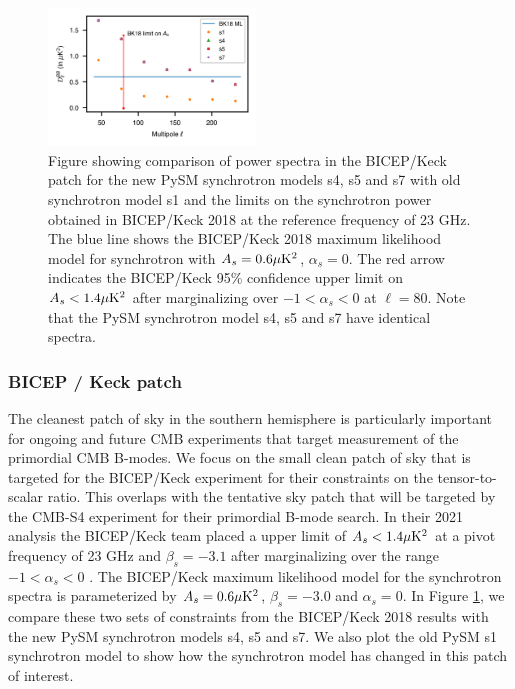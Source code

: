 \documentclass[twocolumn]{aastex631}
\begin{document}
\begin{figure}
    \centering
    \includegraphics[width=0.49\textwidth]{figures/Dlcomp_PySM3-4b8_BKpatch.png}
    \caption{Figure showing comparison of power spectra in the BICEP/Keck patch for the new PySM synchrotron models s4, s5 and s7 with old synchrotron model s1 and the limits on the synchrotron power obtained in BICEP/Keck 2018 \citep{Ade:2021} at the reference frequency of 23 GHz. The blue line shows the BICEP/Keck 2018 maximum likelihood model for synchrotron with $A_s=0.6 \mu {\rm K}^2$, $\alpha_s=0$. The red arrow indicates the BICEP/Keck 95\% confidence upper limit on $A_s<1.4 \mu {\rm K}^2$ after marginalizing over $-1<\alpha_s<0$ at $\ell=80$. Note that the PySM synchrotron model s4, s5 and s7 have identical spectra.}
    \label{fig:Dl_sync_BK}
\end{figure}

\subsubsection{BICEP / Keck patch}
The cleanest patch of sky in the southern hemisphere is particularly important for ongoing and future CMB experiments that target measurement of the primordial CMB B-modes. We focus on the small clean patch of sky that is targeted for the BICEP/Keck experiment for their constraints on the tensor-to-scalar ratio. This overlaps with the tentative sky patch that will be targeted by the CMB-S4 experiment for their primordial B-mode search. In their 2021 analysis the BICEP/Keck team placed a upper limit of $A_s<1.4 \mu{\rm K}^2$ at a pivot frequency of 23 GHz and $\beta_s=-3.1$ after marginalizing over the range $-1<\alpha_s<0$ \citep{Ade:2021}. The BICEP/Keck maximum likelihood model for the synchrotron spectra is parameterized by $A_s=0.6 \mu{\rm K}^2$, $\beta_s=-3.0$ and $\alpha_s=0$. In Figure \ref{fig:Dl_sync_BK}, we compare  these two sets of constraints from the BICEP/Keck 2018 results with the new PySM synchrotron models s4, s5 and s7. We also plot the old PySM s1 synchrotron model to show how the synchrotron model has changed in this patch of interest.
\end{document}
